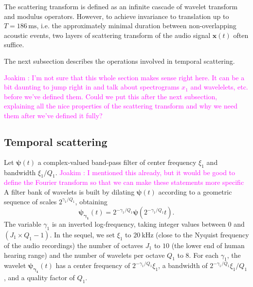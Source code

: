 \documentclass[journal]{IEEEtran}
\makeatletter
\newcommand*{\ie}{i.e.\@\xspace}
\newcommand{\ja}[1]{\textcolor{magenta}{Joakim : #1}}
\makeatother
\begin{document}
The scattering transform is defined as an infinite cascade of wavelet transform and modulus operators.
However, to achieve invariance to translation up to $T = 186\,\mathrm{ms}$, \ie the approximately minimal duration between non-overlapping acoustic events, two layers of scattering transform of the audio signal $\boldsymbol{x}(t)$ often suffice.

The next subsection describes the operations involved in temporal scattering.

\ja{I'm not sure that this whole section makes sense right here. It can be a bit daunting to jump right in and talk about spectrograms $x_1$ and wavelelets, etc. before we've defined them. Could we put this after the next subsection, explaining all the nice properties of the scattering transform and why we need them after we've defined it fully?}

\subsection{Temporal scattering}
Let $\boldsymbol{\psi}(t)$ a complex-valued band-pass filter of
center frequency $\xi_1$ and bandwidth $\xi_1/Q_1$. \ja{I mentioned this already, but it would be good to define the Fourier transform so that we can make these statements more specific}
A filter bank of wavelets is built by dilating $\boldsymbol{\psi}(t)$
according to a geometric sequence of scales $2^{\gamma_1/Q_1}$, obtaining
\begin{equation}
\boldsymbol{\psi_{\gamma_1}}(t) = 2^{-\gamma_1/Q_1} \boldsymbol{\psi}(2^{-\gamma_1/Q_1} t)\mbox{.}
\end{equation}
The variable $\gamma_1$ is an inverted log-frequency, taking integer values between $0$ and $(J_1 \times Q_1 - 1)$.
In the sequel, we set $\xi_1$ to $20~\mathrm{kHz}$ (close to the Nyquist frequency of the audio recordings) the number of octaves $J_1$ to $10$ (the lower end of human hearing range) and the number of wavelets per octave $Q_1$ to $8$.
For each $\gamma_1$, the wavelet $\boldsymbol{\psi_{\gamma_1}}(t)$
has a center frequency of $2^{-\gamma_1/Q_1}\xi_1$, a bandwidth of $2^{-\gamma_1/Q_1}\xi_1/Q_1$, and a quality factor of $Q_1$.
\end{document}
